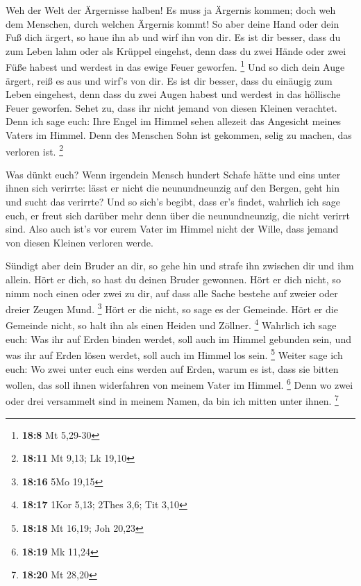  Weh der Welt der Ärgernisse halben! Es muss ja Ärgernis
kommen; doch weh dem Menschen, durch welchen Ärgernis kommt!
 So aber deine Hand oder dein Fuß dich ärgert, so haue ihn
ab und wirf ihn von dir. Es ist dir besser, dass du zum Leben lahm oder
als Krüppel eingehst, denn dass du zwei Hände oder zwei Füße habest und
werdest in das ewige Feuer geworfen. \footnote{\textbf{18:8} Mt 5,29-30}
 Und so dich dein Auge ärgert, reiß es aus und wirf's von
dir. Es ist dir besser, dass du einäugig zum Leben eingehest, denn dass
du zwei Augen habest und werdest in das höllische Feuer geworfen.
 Sehet zu, dass ihr nicht jemand von diesen Kleinen
verachtet. Denn ich sage euch: Ihre Engel im Himmel sehen allezeit das
Angesicht meines Vaters im Himmel.  Denn des Menschen
Sohn ist gekommen, selig zu machen, das verloren ist. \footnote{\textbf{18:11}
  Mt 9,13; Lk 19,10}

 Was dünkt euch? Wenn irgendein Mensch hundert Schafe
hätte und eins unter ihnen sich verirrte: lässt er nicht die
neunundneunzig auf den Bergen, geht hin und sucht das verirrte?
 Und so sich's begibt, dass er's findet, wahrlich ich
sage euch, er freut sich darüber mehr denn über die neunundneunzig, die
nicht verirrt sind.  Also auch ist's vor eurem Vater im
Himmel nicht der Wille, dass jemand von diesen Kleinen verloren werde.

 Sündigt aber dein Bruder an dir, so gehe hin und strafe
ihn zwischen dir und ihm allein. Hört er dich, so hast du deinen Bruder
gewonnen.  Hört er dich nicht, so nimm noch einen oder
zwei zu dir, auf dass alle Sache bestehe auf zweier oder dreier Zeugen
Mund. \footnote{\textbf{18:16} 5Mo 19,15}  Hört er die
nicht, so sage es der Gemeinde. Hört er die Gemeinde nicht, so halt ihn
als einen Heiden und Zöllner. \footnote{\textbf{18:17} 1Kor 5,13; 2Thes
  3,6; Tit 3,10}  Wahrlich ich sage euch: Was ihr auf
Erden binden werdet, soll auch im Himmel gebunden sein, und was ihr auf
Erden lösen werdet, soll auch im Himmel los sein. \footnote{\textbf{18:18}
  Mt 16,19; Joh 20,23}  Weiter sage ich euch: Wo zwei
unter euch eins werden auf Erden, warum es ist, dass sie bitten wollen,
das soll ihnen widerfahren von meinem Vater im Himmel. \footnote{\textbf{18:19}
  Mk 11,24}  Denn wo zwei oder drei versammelt sind in
meinem Namen, da bin ich mitten unter ihnen. \footnote{\textbf{18:20} Mt
  28,20}

